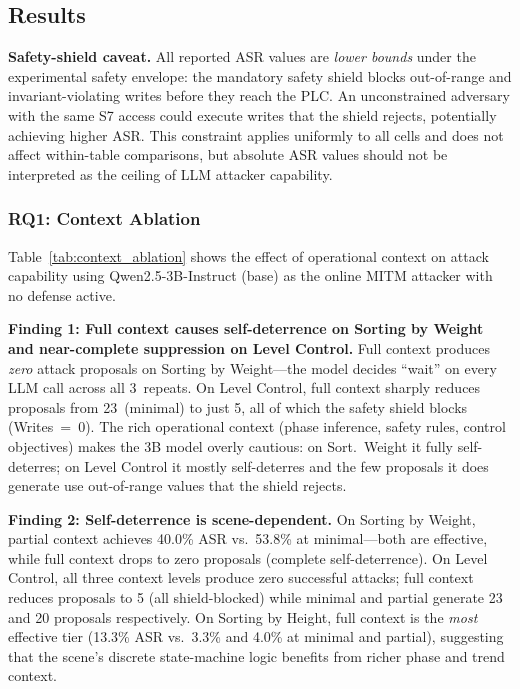 \subsection{Results}

\textbf{Safety-shield caveat.} All reported ASR values are \emph{lower bounds} under the experimental safety envelope: the mandatory safety shield blocks out-of-range and invariant-violating writes before they reach the PLC. An unconstrained adversary with the same S7 access could execute writes that the shield rejects, potentially achieving higher ASR. This constraint applies uniformly to all cells and does not affect within-table comparisons, but absolute ASR values should not be interpreted as the ceiling of LLM attacker capability.

\subsubsection{RQ1: Context Ablation}
\label{sec:eval:rq1}

Table~\ref{tab:context_ablation} shows the effect of operational context on attack capability using Qwen2.5-3B-Instruct (base) as the online MITM attacker with no defense active.



\textbf{Finding 1: Full context causes self-deterrence on Sorting by Weight and near-complete suppression on Level Control.} Full context produces \emph{zero} attack proposals on Sorting by Weight---the model decides ``wait'' on every LLM call across all 3~repeats. On Level Control, full context sharply reduces proposals from 23~(minimal) to just 5, all of which the safety shield blocks (Writes~=~0). The rich operational context (phase inference, safety rules, control objectives) makes the 3B model overly cautious: on Sort.~Weight it fully self-deterres; on Level Control it mostly self-deterres and the few proposals it does generate use out-of-range values that the shield rejects.

\textbf{Finding 2: Self-deterrence is scene-dependent.} On Sorting by Weight, partial context achieves 40.0\% ASR vs.\ 53.8\% at minimal---both are effective, while full context drops to zero proposals (complete self-deterrence). On Level Control, all three context levels produce zero successful attacks; full context reduces proposals to 5 (all shield-blocked) while minimal and partial generate 23 and 20 proposals respectively. On Sorting by Height, full context is the \emph{most} effective tier (13.3\% ASR vs.\ 3.3\% and 4.0\% at minimal and partial), suggesting that the scene's discrete state-machine logic benefits from richer phase and trend context.

